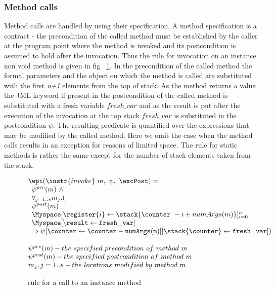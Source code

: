 \subsubsection{Method calls}
Method calls are handled by using their specification. A method specification is a contract - the precondition of the called method
must be established by the caller at the program point where the method is invoked and its postcondition is assumed to hold after the invocation. Thus the rule for
invocation on an instance non void method is given in fig ~\ref{wpInv}. In the precondition of the called method the formal parameters and the object on which the method is called are substituted with the first \textit{n+1} elements from the top of stack. As the method returns a value the JML keyword 
 if present in the postcondition of the called method is substituted with a fresh variable $fresh\_var$ and as the result is put after the execution of the invocation at the top stack $fresh\_var$ is substituted in the postcondition $\psi$. The resulting predicate is quantified over the 
expressions that may be modified by the called method. Here we omit the case when the method calls results in an exception for reasons of limited space. 
The rule for static methods is rather the same except for the number of stack elements taken from the stack.  

\begin{figure}[!ht]
$$
\begin{array}{l}
\wpi(\instr{invoke} \ m, \ \psi ,\ \excPost) =\\ 
\begin{array}{l}
\psi^{pre}(m) \ \wedge \\
 \forall_{j = 1..s} m_{j}.( \\
\psi^{post}(m) \\
\Myspace [\register{i}  \leftarrow \stack{\counter \ - i + numArgs(m)}]_{i=0}^n  \\
\Myspace  [\tt{\backslash result} \leftarrow fresh\_var] \\
\Rightarrow \psi[\counter \leftarrow \counter - \tt{numArgs}(m)][\stack{\counter }  \leftarrow \tt{fresh\_var}]) \\
\end{array} \\[15 mm]
\psi^{pre}(m) - the \ specified \ precondition \ of \ method \ m \\
\psi^{post}(m) - the \ specified \ postcondition \ of \ method \ m \\
m_{j} , j = 1 .. s - the \ locations \ modified \ by \ method \ m
\end{array}
$$
\caption{\wpi \ rule for a call to an instance method}
\label{wpInv}
\end{figure}
